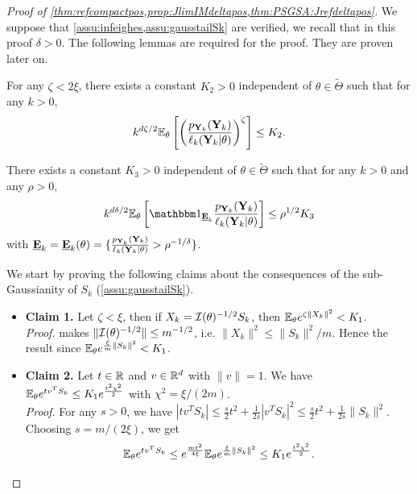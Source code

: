 \begin{proof}[Proof of \cref{thm:refcompactpos,prop:JlimIMdeltapos,thm:PSGSA:Jrefdeltapos}]
    We suppose that \cref{assu:infeighes,assu:gausstailSk} are verified, we recall that in this proof $\delta>0$. The following lemmas are required for the proof. They are proven later on.

    \begin{lem}\label{lem:technicalLemma}
        For any $\zeta<2\xi$, there exists a constant $K_2>0$ independent of $\theta\in\tilde\Theta$ such that for any $k>0$,
              \begin{equation}
                  k^{d\zeta/2}\mathbb{E}_\theta\left[\left(\frac{p_{\mathbf{Y}_k}(\mathbf{Y}_k)}{\ell_k(\mathbf{Y}_k|\theta)}\right)^\zeta\right]\leq K_2.
              \end{equation}
      \end{lem}    
      \begin{lem}\label{lem:lem2}
          There exists a constant $K_3>0$ independent of $\theta\in\tilde\Theta$ %
          such that for any $k>0$ and any $\rho>0$, %
          \begin{equation}
            k^{d\delta/2} \EE_\theta\left[ \indic_{\underline{\mbf E}_k} \frac{p_{\mbf Y_k}(\mbf Y_k)}{\ell_k(\mbf Y_k|\theta)} \right] \leq \rho^{1/2} K_3 
          \end{equation}
          with $\underline{\mathbf{E}}_k = \underline{\mathbf{E}}_k(\theta)=\{ \frac{p_{\mathbf{Y}_k}(\mathbf{Y}_k)}{\ell_k(\mathbf{Y}_k|\theta)}>\rho^{-1/\delta}\}$.
      \end{lem}

      We start by proving the following claims about the consequences of the sub-Gaussianity of $S_k$ (\cref{assu:gausstailSk}).
      \begin{itemize}
        \item \textbf{Claim 1.} Let $\zeta<\xi$, then if $X_k=\mathcal{I}(\theta)^{-1/2}S_k$, then $\mathbb{E}_\theta e^{\zeta\|X_k\|^2} < K_1$.\\
            \emph{Proof.}  makes $\|\mathcal{I}(\theta)^{-1/2}\|\leq m^{-1/2}$, i.e. $\| X_k\|^2\leq \| S_k \|^2/m$. Hence the result since $\mathbb{E}_\theta e^{\frac{\xi}{m}\|S_k\|^2}<K_1$.
        \item \textbf{Claim 2.} Let $t\in\mathbb{R}$ and $v\in\mathbb{R}^d$ with $\|v\|=1$. We have $\mathbb{E}_\theta e^{tv^TS_k}\leq K_1 e^{\frac{t^2\chi^2}{2}}$ with $\chi^2=\xi/(2m)$.\\
            \emph{Proof.} For any $s >0$, we have 
$|tv^TS_k|\leq \frac{s}{2} t^2 +\frac{1}{2s} |v^TS_k|^2 \leq  \frac{s}{2} t^2 +\frac{1}{2s} \|S_k\|^2 $.
Choosing $s=m/(2\xi)$, we get
\begin{equation}
    \mathbb{E}_\theta e^{tv^TS_k} \leq 
e^{\frac{m t^2}{4\xi}} \mathbb{E}_{\theta} e^{ \frac{\xi}{m} \|S_k\|^2} \leq K_1 e^{ \frac{t^2\chi^2}{2}}.
\end{equation}
      \end{itemize}


\end{proof}
